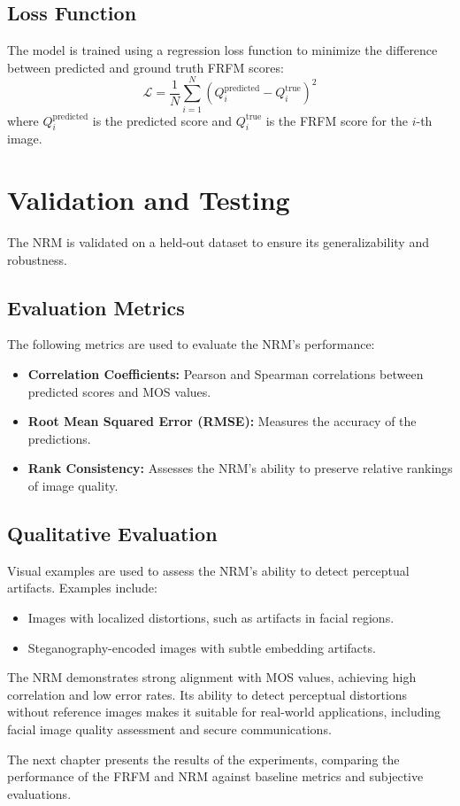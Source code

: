 \subsection{Loss Function}

The model is trained using a regression loss function to minimize the difference between predicted and ground truth FRFM scores:
\[
\mathcal{L} = \frac{1}{N} \sum_{i=1}^{N} (Q_i^{\text{predicted}} - Q_i^{\text{true}})^2
\]
where \(Q_i^{\text{predicted}}\) is the predicted score and \(Q_i^{\text{true}}\) is the FRFM score for the \(i\)-th image.

\section{Validation and Testing}

The NRM is validated on a held-out dataset to ensure its generalizability and robustness.

\subsection{Evaluation Metrics}

The following metrics are used to evaluate the NRM’s performance:
\begin{itemize}
    \item \textbf{Correlation Coefficients:} Pearson and Spearman correlations between predicted scores and MOS values.
    \item \textbf{Root Mean Squared Error (RMSE):} Measures the accuracy of the predictions.
    \item \textbf{Rank Consistency:} Assesses the NRM’s ability to preserve relative rankings of image quality.
\end{itemize}

\subsection{Qualitative Evaluation}

Visual examples are used to assess the NRM’s ability to detect perceptual artifacts. Examples include:
\begin{itemize}
    \item Images with localized distortions, such as artifacts in facial regions.
    \item Steganography-encoded images with subtle embedding artifacts.
\end{itemize}

The NRM demonstrates strong alignment with MOS values, achieving high correlation and low error rates. Its ability to detect perceptual distortions without reference images makes it suitable for real-world applications, including facial image quality assessment and secure communications.

The next chapter presents the results of the experiments, comparing the performance of the FRFM and NRM against baseline metrics and subjective evaluations.
